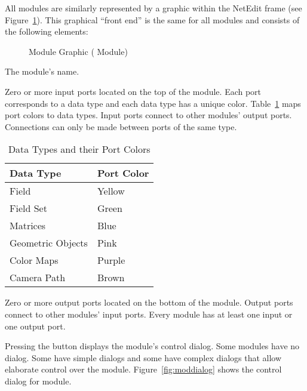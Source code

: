 All modules are similarly represented by a graphic within the NetEdit frame
(see Figure~\ref{fig:modgraphic}). This graphical ``front end'' is the same
for all modules and consists of the following elements:

\begin{figure}[htb]
  \begin{makeimage}
  \end{makeimage}
  \modgraphic
  \caption{\label{fig:modgraphic} Module Graphic ( Module)}
\end{figure}

\begin{description}
   The module's name.
  
   Zero or more input ports located on the top
  of the module.  Each port corresponds to a data type and each data
  type has a unique color.  Table~\ref{tab:portcolors} maps port
  colors to data types.  Input ports connect to other modules' output
  ports.  Connections can only be made between ports of the same type.

  \begin{table}[htbp]
    \begin{center}
      \begin{tabular}{|l|l|}
        \hline
        \textbf{Data Type} & \textbf{Port Color} \\
        \hline
        Field & Yellow \\
        Field Set & Green \\
        Matrices & Blue \\
        Geometric Objects & Pink \\
        Color Maps & Purple \\
        Camera Path & Brown \\
        \hline
      \end{tabular}
      \caption{Data Types and their Port Colors}
      \label{tab:portcolors}
    \end{center}
  \end{table}
  
   Zero or more output ports located on the
  bottom of the module.  Output ports connect to other modules' input
  ports.  Every module has  at least one input or one output
  port.
  
   Pressing the  button displays the
  module's control dialog. Some modules have no dialog. Some have
  simple dialogs and some have complex dialogs that allow
  elaborate control over the module.  Figure~\ref{fig:moddialog} shows
  the control dialog for  module.
  

\end{description}
